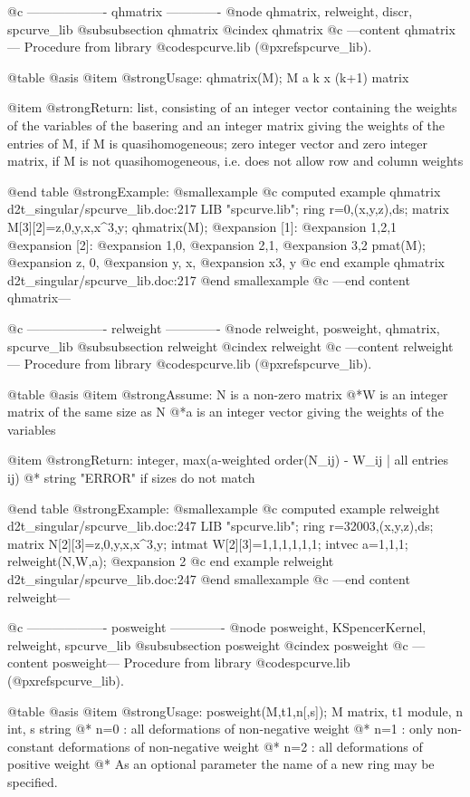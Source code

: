 @c ------------------- qhmatrix -------------
@node qhmatrix, relweight, discr, spcurve_lib
@subsubsection qhmatrix
@cindex qhmatrix
@c ---content qhmatrix---
Procedure from library @code{spcurve.lib} (@pxref{spcurve_lib}).

@table @asis
@item @strong{Usage:}
qhmatrix(M); M a k x (k+1) matrix

@item @strong{Return:}
list, consisting of an integer vector containing the weights of
the variables of the basering and an integer matrix giving the
weights of the entries of M, if M is quasihomogeneous;
zero integer vector and zero integer matrix, if M is not
quasihomogeneous, i.e. does not allow row and column weights

@end table
@strong{Example:}
@smallexample
@c computed example qhmatrix d2t_singular/spcurve_lib.doc:217 
LIB "spcurve.lib";
ring r=0,(x,y,z),ds;
matrix M[3][2]=z,0,y,x,x^3,y;
qhmatrix(M);
@expansion{} [1]:
@expansion{}    1,2,1
@expansion{} [2]:
@expansion{}    1,0,
@expansion{}    2,1,
@expansion{}    3,2 
pmat(M);
@expansion{} z,  0, 
@expansion{} y,  x, 
@expansion{} x3, y
@c end example qhmatrix d2t_singular/spcurve_lib.doc:217
@end smallexample
@c ---end content qhmatrix---

@c ------------------- relweight -------------
@node relweight, posweight, qhmatrix, spcurve_lib
@subsubsection relweight
@cindex relweight
@c ---content relweight---
Procedure from library @code{spcurve.lib} (@pxref{spcurve_lib}).

@table @asis
@item @strong{Assume:}
N is a non-zero matrix
@*W is an integer matrix of the same size as N
@*a is an integer vector giving the weights of the variables

@item @strong{Return:}
integer, max(a-weighted order(N_ij) - W_ij | all entries ij) @*
string "ERROR" if sizes do not match

@end table
@strong{Example:}
@smallexample
@c computed example relweight d2t_singular/spcurve_lib.doc:247 
LIB "spcurve.lib";
ring r=32003,(x,y,z),ds;
matrix N[2][3]=z,0,y,x,x^3,y;
intmat W[2][3]=1,1,1,1,1,1;
intvec a=1,1,1;
relweight(N,W,a);
@expansion{} 2
@c end example relweight d2t_singular/spcurve_lib.doc:247
@end smallexample
@c ---end content relweight---

@c ------------------- posweight -------------
@node posweight, KSpencerKernel, relweight, spcurve_lib
@subsubsection posweight
@cindex posweight
@c ---content posweight---
Procedure from library @code{spcurve.lib} (@pxref{spcurve_lib}).

@table @asis
@item @strong{Usage:}
posweight(M,t1,n[,s]); M matrix, t1 module, n int, s string @*
n=0 : all deformations of non-negative weight @*
n=1 : only non-constant deformations of non-negative weight @*
n=2 : all deformations of positive weight @*
As an optional parameter the name of a new ring may be
specified.

